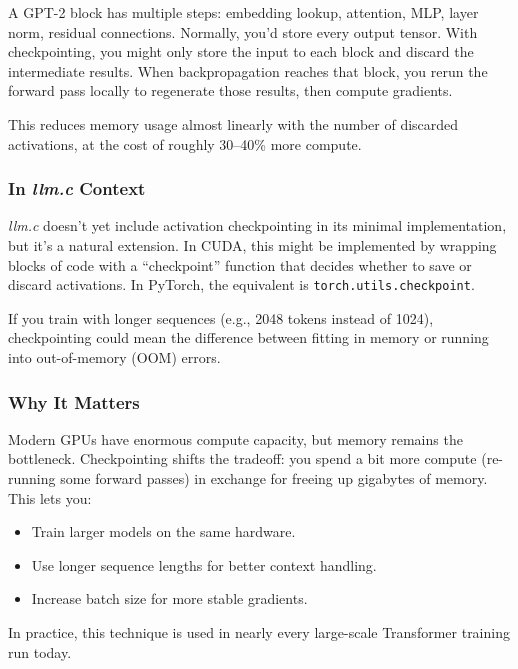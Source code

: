 \documentclass[
  letterpaper,
  DIV=11,
  numbers=noendperiod]{scrreprt}
\providecommand{\tightlist}{%
  \setlength{\itemsep}{0pt}\setlength{\parskip}{0pt}}
\begin{document}
A GPT-2 block has multiple steps: embedding lookup, attention, MLP,
layer norm, residual connections. Normally, you'd store every output
tensor. With checkpointing, you might only store the input to each block
and discard the intermediate results. When backpropagation reaches that
block, you rerun the forward pass locally to regenerate those results,
then compute gradients.

This reduces memory usage almost linearly with the number of discarded
activations, at the cost of roughly 30--40\% more compute.

\subsubsection{\texorpdfstring{In \emph{llm.c}
Context}{In llm.c Context}}\label{in-llm.c-context}

\emph{llm.c} doesn't yet include activation checkpointing in its minimal
implementation, but it's a natural extension. In CUDA, this might be
implemented by wrapping blocks of code with a ``checkpoint'' function
that decides whether to save or discard activations. In PyTorch, the
equivalent is \texttt{torch.utils.checkpoint}.

If you train with longer sequences (e.g., 2048 tokens instead of 1024),
checkpointing could mean the difference between fitting in memory or
running into out-of-memory (OOM) errors.

\subsubsection{Why It Matters}\label{why-it-matters-42}

Modern GPUs have enormous compute capacity, but memory remains the
bottleneck. Checkpointing shifts the tradeoff: you spend a bit more
compute (re-running some forward passes) in exchange for freeing up
gigabytes of memory. This lets you:

\begin{itemize}
\tightlist
\item
  Train larger models on the same hardware.
\item
  Use longer sequence lengths for better context handling.
\item
  Increase batch size for more stable gradients.
\end{itemize}

In practice, this technique is used in nearly every large-scale
Transformer training run today.
\end{document}
